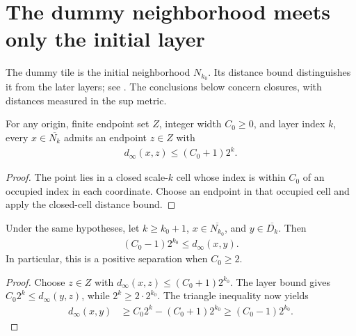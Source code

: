 \section{The dummy neighborhood meets only the initial layer}
\label{sec:area_law_dummy_contacts}

The dummy tile is the initial neighborhood $N_{k_0}$. Its distance
bound distinguishes it from the later layers; see
\cite[Section~11]{OpenAI2026AreaLaw}. The conclusions below concern
closures, with distances measured in the sup metric.


\begin{lemma}
    \label{thm:area_law_neighborhood_endpoint_distance}
    \leanok
    For any origin, finite endpoint set $Z$, integer width $C_0\ge 0$,
    and layer index $k$, every $x\in\overline{N_k}$ admits
    an endpoint $z\in Z$ with
    \begin{align}
        d_\infty(x,z)\le(C_0+1)2^k.
    \end{align}
\end{lemma}
\begin{proof}\leanok
    The point lies in a closed scale-$k$ cell whose index is within
    $C_0$ of an occupied index in each coordinate. Choose an endpoint
    in that occupied cell and apply the closed-cell distance bound.
\end{proof}

\begin{lemma}
    \label{thm:area_law_dummy_later_layer_separation}
    \leanok
    Under the same hypotheses, let $k\ge k_0+1$,
    $x\in\overline{N_{k_0}}$, and $y\in\overline{D_k}$. Then
    \begin{align}
        (C_0-1)2^{k_0}\le d_\infty(x,y).
    \end{align}
    In particular, this is a positive separation when $C_0\ge2$.
\end{lemma}
\begin{proof}\leanok
    Choose $z\in Z$ with
    $d_\infty(x,z)\le(C_0+1)2^{k_0}$. The layer bound gives
    $C_0 2^k\le d_\infty(y,z)$, while $2^k\ge2\cdot2^{k_0}$.
    The triangle inequality now yields
    \begin{align}
        d_\infty(x,y) & \ge C_0 2^k-(C_0+1)2^{k_0}
        \ge(C_0-1)2^{k_0}.
    \end{align}
\end{proof}

